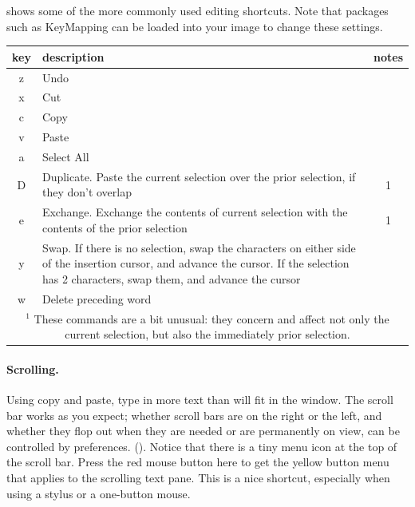 \documentclass[a4paper,10pt,twoside]{book}
\begin{document}
 shows some of the more commonly used editing shortcuts. Note that packages such as KeyMapping can be loaded into your image to change these settings. 


\begin{table}[htbp]
   \centering
   \begin{tabular}{cp{5in}c} 			%
      \toprule
      key    & description & notes\\
      \midrule
      z      & Undo &  \\
      x      & Cut    &  \\
      c      & Copy  &  \\
      v      & Paste  &  \\
      a      & Select All  &  \\
      D      & Duplicate.  Paste the current selection over the prior selection, if they don't overlap & 1 \\
      e      & Exchange. Exchange the contents of current selection with the contents of the prior selection & 1 \\
      y      & Swap. If there is no selection, swap the characters on either side of the insertion cursor, and advance the cursor. If the selection has 2 characters, swap them, and advance the cursor &  \\
      w     & Delete preceding word   &   \\
      \midrule
      \multicolumn{3}{p{6in}}{${}^{1}$ These commands are a bit unusual: they concern and affect not only the current selection, but also the immediately prior selection.} \\
      \bottomrule
   \end{tabular}
\end{table}


\paragraph{Scrolling.} Using copy and paste, type in more text than will fit in the window. The scroll bar works as you expect; whether scroll bars are on the right or the left, and whether they flop out when they are needed or are permanently on view, can be controlled by preferences. (). 
Notice that there is a tiny menu icon at the top of the scroll bar. Press the red mouse button here to get the yellow button menu that applies to the scrolling text pane. This is a nice shortcut, especially when using a stylus or a one-button mouse.
\end{document}
